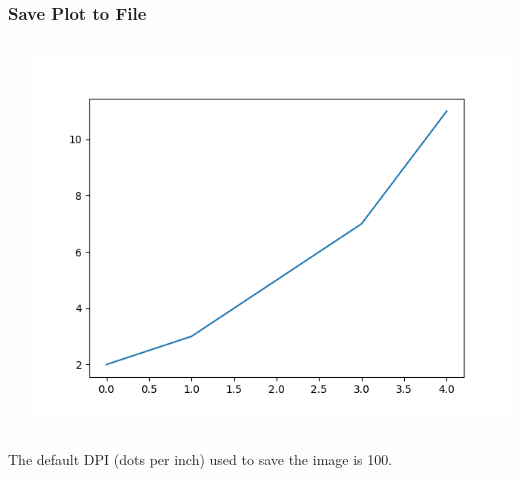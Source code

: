 \documentclass[xcolor={svgnames}]{beamer}
\newcommand{\pyfile}[2][]{}
\begin{document}
\begin{frame}
    \frametitle{Save Plot to File}
    \begin{columns}
        \begin{column}{0.52\textwidth}
            \pyfile[linerange={1-4}]{examples/01-savefig.py}
        \end{column}
        \begin{column}{0.48\textwidth}
            \includegraphics[width=\textwidth]{img/01-savefig-dpi-none.png}
        \end{column}
    \end{columns}
    \small
    \vspace{15mm}
    \hspace{-1.97mm}
    The default DPI (dots per inch) used to save the image is 100.
\end{frame}
\end{document}
